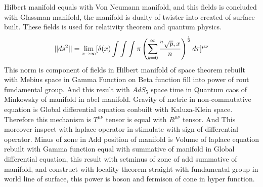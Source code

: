 \documentclass{jsarticle}
\begin{document}
 Hilbert manifold equals with Von Neumann manifold, and this fields is concluded with Glassman manifold,
the manifold is dualty of twister into created of surface built.
These fields is used for relativity theorem and quantum physics.
$$ ||ds^2|| = \lim_{x \to \infty} [\delta(x) \int \int \int \pi \left( \sum_{k=0}^{\infty}
		{{}^n\sqrt{p},x \over n} \right)
^{1 \over 2}d \tau]^{\mu\nu} $$
  This norm is component of fields in Hilbert manifold of space theorem rebuilt with
Mebius space in Gamma Function on Beta function fill into power of rout fundamental
group.
And this result with $AdS_5$ space time in Quantum caos of Minkowsky of manifold in
abel manifold.
Gravity of metric in non-commutative equation is Global differential equation
conbuilt with Kaluza-Klein space. Therefore this mechanism is $T^{\mu\nu}$ tensor
is equal with $R^{\mu\nu}$ tensor. And This moreover inspect with laplace operator
in stimulate with sign of differential operator.
Minus of zone in Add position of manifold is Volume of laplace equation rebuilt with
Gamma function equal with summative of manifold in Global differential equation,
this result with setminus of zone of add summative of manifold, and construct with
locality theorem straight with fundamental group in world line of surface, this
power is boson and fermison of cone in hyper function.
\end{document}
